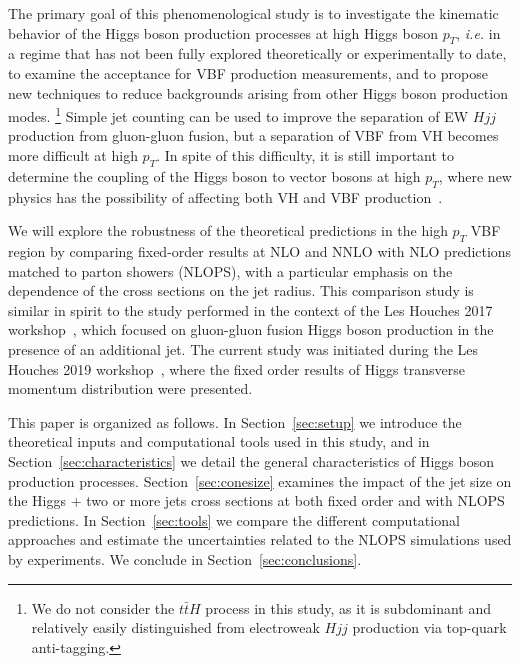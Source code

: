\documentclass[10pt,prd,fleqn,superscriptaddress,notitlepage,nofootinbib,preprintnumbers,nobalancelastpage]{revtex4-1}
\newcommand{\VBF}{VBF\xspace}
\newcommand{\VH}{VH\xspace}
\begin{document}
The primary goal of this phenomenological study is to investigate the kinematic behavior of the Higgs boson production processes at high Higgs boson $p_T$, \emph{i.e.} in  a regime that has not been fully explored theoretically or experimentally to date, to examine the acceptance for  \VBF production measurements, and to propose new techniques to reduce backgrounds arising from other Higgs boson production modes.%
\footnote{We do not consider the $t\bar{t}H$ process in this study, as it is subdominant and relatively easily distinguished from electroweak $Hjj$ production via top-quark anti-tagging.} Simple jet counting can be used to improve the separation of  EW $Hjj$ production from gluon-gluon fusion, but a separation of \VBF from \VH becomes more difficult at high $p_T$.
In spite of this difficulty, it is still important to determine the coupling of the Higgs boson to vector bosons at high $p_T$, where new physics has the possibility of affecting both \VH and \VBF production~\cite{Araz:2020zyh}.

We will explore the robustness of the theoretical predictions in the high $p_T$ VBF region by comparing fixed-order results at NLO and NNLO with NLO predictions matched to parton showers (NLOPS), with a particular emphasis on the dependence of the cross sections on the jet radius. This comparison study is similar in spirit to the study performed in the context of the Les Houches 2017 workshop~\cite{Bellm:2019yyh}, which focused on gluon-gluon fusion Higgs boson production in the presence of an additional jet. The current study was initiated during the Les Houches 2019 workshop~\cite{Amoroso:2020lgh}, where the fixed order results of Higgs transverse momentum distribution were presented. 

This paper is organized as follows. In Section~\ref{sec:setup} we introduce the theoretical inputs and computational tools used in this study, and in Section~\ref{sec:characteristics} we detail the general characteristics of Higgs boson production processes. Section~\ref{sec:conesize} examines the impact of the jet size on the Higgs + two or more jets cross sections at both fixed order and with NLOPS predictions. In Section~\ref{sec:tools} we compare the different computational approaches and estimate the uncertainties related to the NLOPS simulations used by experiments. We conclude in Section~\ref{sec:conclusions}.
\end{document}
